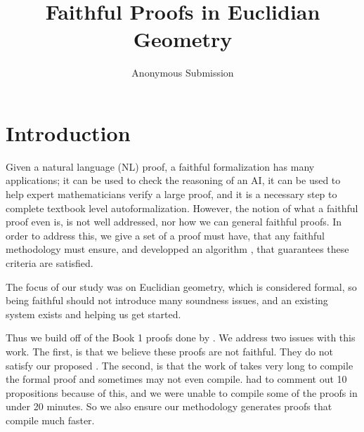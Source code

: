 \documentclass[letterpaper]{article} %
\title{Faithful Proofs in Euclidian Geometry}
\author{Anonymous Submission}
\begin{document}
\maketitle

\begin{abstract}
\cite{avigad_formal_2009}
\end{abstract}



\section{Introduction}
Given a natural language (NL) proof, a faithful formalization has many applications; it can be used to check the reasoning of an AI, it can be used to help expert mathematicians verify a large proof, and it is a necessary step to complete textbook level autoformalization. However, the notion of what a faithful proof even is, is not well addressed, nor how we can general faithful proofs. In order to address this, we give a set of \faithfulcriteria a proof must have, that any faithful methodology must ensure, and developped an algorithm \methodname, that guarantees these criteria are satisfied.

The focus of our study was on Euclidian geometry, which is considered formal, so being faithful should not introduce many soundness issues, and an existing system exists \citep{murphy_autoformalizing_2024} and \citep{avigad_formal_2009} helping us get started.

Thus we build off of the Book 1 proofs done by \citet{murphy_autoformalizing_2024}. We address two issues with this work. The first, is that we believe these proofs are not faithful. They do not satisfy our proposed \faithfulcriteria. The second, is that the work of \citet{murphy_autoformalizing_2024} takes very long to compile the formal proof and sometimes may not even compile. \citet{min_divide_2026} had to comment out 10 propositions because of this, and we were unable to compile some of the proofs in under 20 minutes. So we also ensure our methodology generates proofs that compile much faster.
\end{document}
